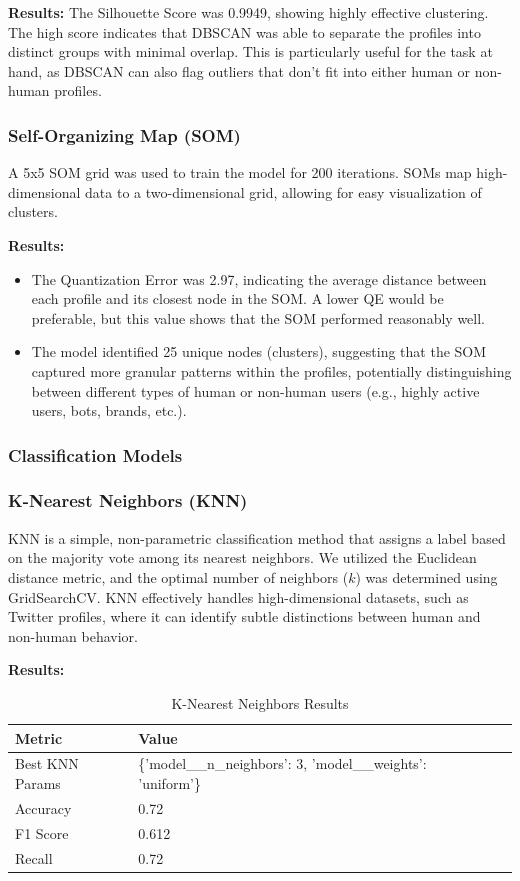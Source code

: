 \documentclass[a4paper,11pt]{article}
\begin{document}
\textbf{Results:} The Silhouette Score was 0.9949, showing highly effective clustering. The high score indicates that DBSCAN was able to separate the profiles into distinct groups with minimal overlap. This is particularly useful for the task at hand, as DBSCAN can also flag outliers that don't fit into either human or non-human profiles.

\subsubsection*{Self-Organizing Map (SOM)}
A 5x5 SOM grid was used to train the model for 200 iterations. SOMs map high-dimensional data to a two-dimensional grid, allowing for easy visualization of clusters.

\textbf{Results:}
\begin{itemize}
    \item The Quantization Error was 2.97, indicating the average distance between each profile and its closest node in the SOM. A lower QE would be preferable, but this value shows that the SOM performed reasonably well.
    \item The model identified 25 unique nodes (clusters), suggesting that the SOM captured more granular patterns within the profiles, potentially distinguishing between different types of human or non-human users (e.g., highly active users, bots, brands, etc.).
\end{itemize}

\subsubsection*{Classification Models}

\subsubsection*{K-Nearest Neighbors (KNN)}
KNN is a simple, non-parametric classification method that assigns a label based on the majority vote among its nearest neighbors. We utilized the Euclidean distance metric, and the optimal number of neighbors (\(k\)) was determined using GridSearchCV. KNN effectively handles high-dimensional datasets, such as Twitter profiles, where it can identify subtle distinctions between human and non-human behavior.

\textbf{Results:}
\begin{table}[h]
    \centering
    \begin{tabular}{|l|l|l|l|}
        \hline
        \textbf{Metric} & \textbf{Value} \\
        \hline
        Best KNN Params & \{'model\_\_n\_neighbors': 3, 'model\_\_weights': 'uniform'\} \\
        Accuracy & 0.72 \\
        F1 Score & 0.612 \\
        Recall & 0.72 \\
        \hline
    \end{tabular}
    \caption{K-Nearest Neighbors Results}
\end{table}
\end{document}
